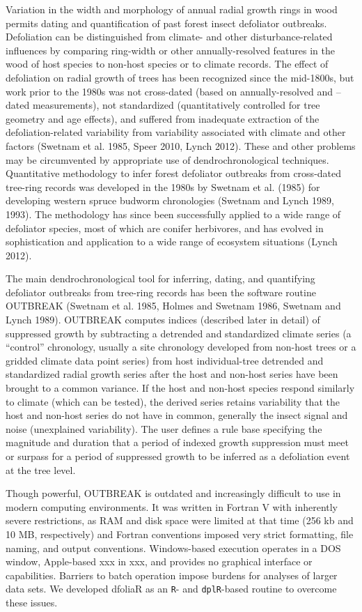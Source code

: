 \documentclass[review]{elsarticle} %
\begin{document}
Variation in the width and morphology of annual radial growth rings in
wood permits dating and quantification of past forest insect defoliator
outbreaks. Defoliation can be distinguished from climate- and other
disturbance-related influences by comparing ring-width or other
annually-resolved features in the wood of host species to non-host
species or to climate records. The effect of defoliation on radial
growth of trees has been recognized since the mid-1800s, but work prior
to the 1980s was not cross-dated (based on annually-resolved and --dated
measurements), not standardized (quantitatively controlled for tree
geometry and age effects), and suffered from inadequate extraction of
the defoliation-related variability from variability associated with
climate and other factors (Swetnam et al. 1985, Speer 2010, Lynch 2012).
These and other problems may be circumvented by appropriate use of
dendrochronological techniques. Quantitative methodology to infer forest
defoliator outbreaks from cross-dated tree-ring records was developed in
the 1980s by Swetnam et al. (1985) for developing western spruce budworm
chronologies (Swetnam and Lynch 1989, 1993). The methodology has since
been successfully applied to a wide range of defoliator species, most of
which are conifer herbivores, and has evolved in sophistication and
application to a wide range of ecosystem situations (Lynch 2012).

The main dendrochronological tool for inferring, dating, and quantifying
defoliator outbreaks from tree-ring records has been the software
routine OUTBREAK (Swetnam et al. 1985, Holmes and Swetnam 1986, Swetnam
and Lynch 1989). OUTBREAK computes indices (described later in detail)
of suppressed growth by subtracting a detrended and standardized climate
series (a ``control'' chronology, usually a site chronology developed
from non-host trees or a gridded climate data point series) from host
individual-tree detrended and standardized radial growth series after
the host and non-host series have been brought to a common variance. If
the host and non-host species respond similarly to climate (which can be
tested), the derived series retains variability that the host and
non-host series do not have in common, generally the insect signal and
noise (unexplained variability). The user defines a rule base specifying
the magnitude and duration that a period of indexed growth suppression
must meet or surpass for a period of suppressed growth to be inferred as
a defoliation event at the tree level.

Though powerful, OUTBREAK is outdated and increasingly difficult to use
in modern computing environments. It was written in Fortran V with
inherently severe restrictions, as RAM and disk space were limited at
that time (256 kb and 10 MB, respectively) and Fortran conventions
imposed very strict formatting, file naming, and output conventions.
Windows-based execution operates in a DOS window, Apple-based xxx in
xxx, and provides no graphical interface or capabilities. Barriers to
batch operation impose burdens for analyses of larger data sets. We
developed dfoliaR as an \texttt{R}- and \texttt{dplR}-based routine to
overcome these issues.
\end{document}
